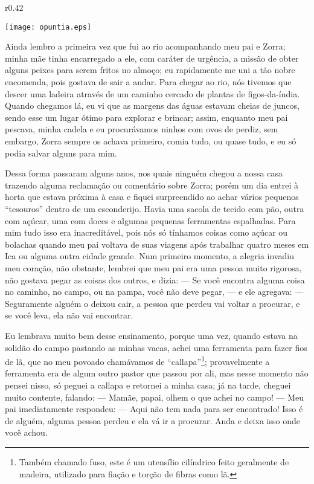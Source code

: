 \ifdefined\EnableIncludeImages
\begin{wrapfigure}{r}{0.42\textwidth}
  \begin{center}
  \vspace{-30pt}
    \texttt{[image: opuntia.eps]}
  \end{center}
  \vspace{-20pt}
\end{wrapfigure}
\fi
Ainda lembro a primeira vez que fui ao rio acompanhando meu pai e Zorra; minha mãe tinha encarregado a ele, com caráter de urgência, a missão de obter alguns peixes para serem fritos no almoço; eu rapidamente me uni a tão nobre encomenda, pois gostava de sair a andar. 
Para chegar ao rio, nós tivemos que descer uma ladeira através de um caminho cercado de plantas de figos-da-índia. Quando chegamos lá, eu vi que as margens das águas estavam cheias de juncos, sendo esse um lugar ótimo para explorar e brincar; assim, enquanto meu pai pescava, minha cadela e eu procurávamos ninhos com ovos de perdiz, sem embargo, Zorra sempre os achava primeiro, comia tudo, ou quase tudo, e eu só podia salvar alguns para mim.


Dessa forma passaram alguns anos, nos quais ninguém chegou a nossa casa trazendo alguma reclamação ou comentário sobre Zorra; porém um dia entrei à horta que estava próxima à casa e fiquei surpreendido ao achar vários pequenos ``tesouros'' dentro de um esconderijo. Havia uma sacola de tecido com pão, outra com açúcar, uma com doces e algumas pequenas ferramentas espalhadas. 
Para mim tudo isso era inacreditável, pois nós só tínhamos coisas como açúcar ou bolachas quando meu pai voltava de suas viagens após trabalhar quatro meses em Ica ou alguma outra cidade grande.
Num primeiro momento, a alegria invadiu meu coração, não obstante, lembrei que meu pai era uma pessoa muito rigorosa, não gostava pegar as coisas dos outros, e dizia: 
--- Se você encontra alguma coisa no caminho, no campo, ou na pampa, você não deve pegar, --- 
e ele agregava: 
--- Seguramente alguém o deixou cair, a pessoa que perdeu vai voltar a procurar, e se você leva, ela não vai encontrar.

Eu lembrava muito bem desse ensinamento, porque uma vez, quando estava na solidão do campo pastando as minhas vacas, achei uma ferramenta para fazer fios de lã, que no meu povoado chamávamos de ``callapa''\footnote{Também chamado fuso, este é um utensílio cilíndrico feito geralmente de madeira, utilizado para fiação e torção de fibras como lã.}; provavelmente a ferramenta era de algum outro pastor que passou por ali, mas nesse momento não pensei nisso, só peguei a callapa e retornei a minha casa; já na tarde, cheguei  muito contente, falando: 
--- Mamãe, papai, olhem o que achei no campo! --- 
Meu pai imediatamente respondeu: 
--- Aqui não tem nada para ser encontrado! Isso é de alguém, alguma pessoa perdeu e ela vá ir a procurar. Anda e deixa isso onde você achou.

